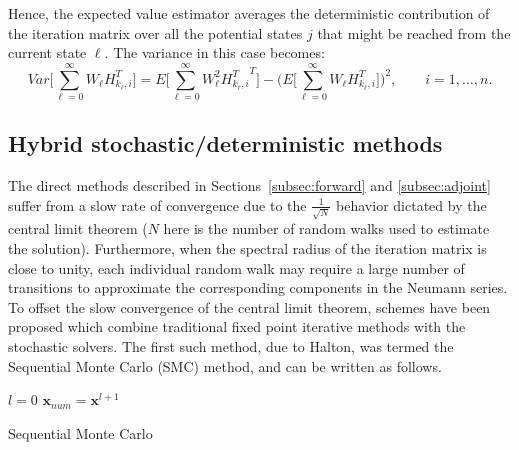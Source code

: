 \documentclass[final,leqno,onefignum,onetabnum]{siamltex1213}
\begin{document}
Hence, the expected value estimator averages
the deterministic contribution of the iteration matrix over all the potential
states $j$ that might be reached from the current state $\ell$. The variance
in this case becomes:
\begin{equation}
Var\bigg [\sum_{\ell=0}^\infty W_{\ell}
H_{k_{\ell},i}^T\bigg]=E\bigg[\sum_{\ell=0}^\infty W_{\ell}^2
{H_{k_{\ell},i}^T}^T\bigg ] - \bigg
(E\bigg[\sum_{\ell=0}^\infty
W_{\ell}
H_{k_{\ell},i}^T\bigg]\bigg )^2, \qquad i=1,\ldots,n
\label{adj_var1}.
\end{equation}

\subsection{Hybrid stochastic/deterministic methods}

The direct methods described in Sections~\ref{subsec:forward} and
\ref{subsec:adjoint} suffer from a slow rate of convergence due to the
$\frac{1}{\sqrt{N}}$ behavior dictated by the central limit theorem ($N$ here
is the number of random walks used to estimate the solution).  Furthermore,
when the spectral radius of the iteration matrix is close to unity, each
individual random walk may require a large number of transitions to
approximate the corresponding components in the Neumann series.
To offset the slow convergence of the central limit theorem, schemes have
been proposed which combine traditional fixed point iterative methods with
the stochastic solvers.  The first such method, due to Halton, was termed
the Sequential Monte Carlo (SMC) method, and can be written as follows.

\begin{algorithm}[H]
 \LinesNumbered
 $l=0$\;
 $\mathbf{x}_{num}=\mathbf{x}^{l+1}$\;
 \caption{Sequential Monte Carlo}
\end{algorithm}
\end{document}
